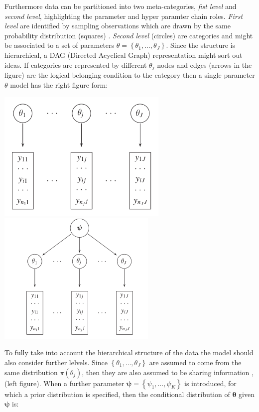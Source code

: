 \documentclass[
  12pt,
  a4paper,
  oneside]{book}
\begin{document}
Furthermore data can be partitioned into two meta-categories, \emph{fist level} and \emph{second level}, highlighting the parameter and hyper paramter chain roles. \emph{First level} are identified by sampling observations which are drawn by the same probability distribution (squares) . \emph{Second level} (circles) are categories and might be associated to a set of parameters \(\theta=\left\{\theta_{1}, \ldots, \theta_{J}\right\}\).
Since the structure is hierarchical, a DAG (Directed Acyclical Graph) \citeyearpar{Blangiardo-Cameletti} representation might sort out ideas. If categories are represented by different \(\theta_{j}\) nodes and edges (arrows in the figure) are the logical belonging condition to the category then a single parameter \(\theta\) model has the right figure form:

\includegraphics{images/thetas.PNG} \includegraphics{images/chis.PNG}

To fully take into account the hierarchical structure of the data the model should also consider further lelvels. Since \(\left\{\theta_{1}, \ldots, \theta_{J}\right\}\) are assumed to come from the same distribution \(\pi(\theta_{j})\), then they are also assumed to be sharing information \citep{Blangiardo-Cameletti}, (left figure). When a further parameter \(\boldsymbol{\psi}=\left\{\psi_{1}, \ldots, \psi_{K}\right\}\) is introduced, for which a prior distribution is specified, then the conditional distribution of \(\boldsymbol{\theta}\) given \(\boldsymbol{\psi}\) is:
\end{document}
